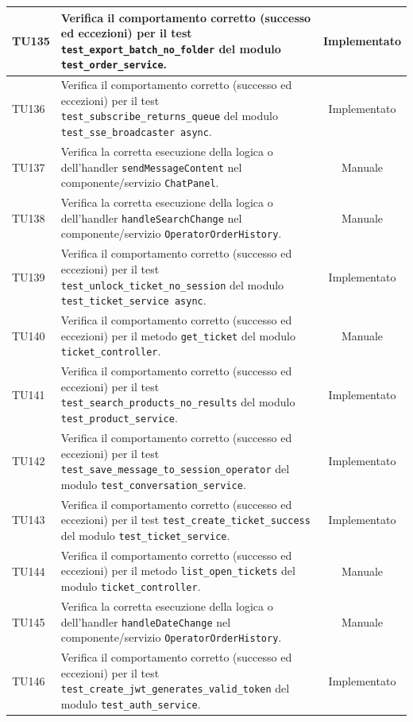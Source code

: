 \documentclass[a4paper,11pt,oneside]{scrartcl}
\begin{document}
\begin{longtable}{|p{1.9cm}|p{11.6cm}|c|}
    TU135 & Verifica il comportamento corretto (successo ed eccezioni) per il test \texttt{test\_export\_batch\_no\_folder} del modulo \texttt{test\_order\_service}. & Implementato \\ \hline
    TU136 & Verifica il comportamento corretto (successo ed eccezioni) per il test \texttt{test\_subscribe\_returns\_queue} del modulo \texttt{test\_sse\_broadcaster     async}. & Implementato \\ \hline
    TU137 & Verifica la corretta esecuzione della logica o dell'handler \texttt{sendMessageContent} nel componente/servizio \texttt{ChatPanel}. & Manuale \\ \hline
    TU138 & Verifica la corretta esecuzione della logica o dell'handler \texttt{handleSearchChange} nel componente/servizio \texttt{OperatorOrderHistory}. & Manuale \\ \hline
    TU139 & Verifica il comportamento corretto (successo ed eccezioni) per il test \texttt{test\_unlock\_ticket\_no\_session} del modulo \texttt{test\_ticket\_service     async}. & Implementato \\ \hline
    TU140 & Verifica il comportamento corretto (successo ed eccezioni) per il metodo \texttt{get\_ticket} del modulo \texttt{ticket\_controller}. & Manuale \\ \hline
    TU141 & Verifica il comportamento corretto (successo ed eccezioni) per il test \texttt{test\_search\_products\_no\_results} del modulo \texttt{test\_product\_service}. & Implementato \\ \hline
    TU142 & Verifica il comportamento corretto (successo ed eccezioni) per il test \texttt{test\_save\_message\_to\_session\_operator} del modulo \texttt{test\_conversation\_service}. & Implementato \\ \hline
    TU143 & Verifica il comportamento corretto (successo ed eccezioni) per il test \texttt{test\_create\_ticket\_success} del modulo \texttt{test\_ticket\_service}. & Implementato \\ \hline
    TU144 & Verifica il comportamento corretto (successo ed eccezioni) per il metodo \texttt{list\_open\_tickets} del modulo \texttt{ticket\_controller}. & Manuale \\ \hline
    TU145 & Verifica la corretta esecuzione della logica o dell'handler \texttt{handleDateChange} nel componente/servizio \texttt{OperatorOrderHistory}. & Manuale \\ \hline
    TU146 & Verifica il comportamento corretto (successo ed eccezioni) per il test \texttt{test\_create\_jwt\_generates\_valid\_token} del modulo \texttt{test\_auth\_service}. & Implementato \\ \hline

\end{longtable}
\end{document}
